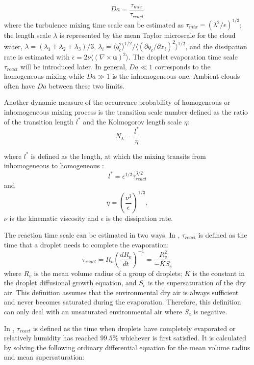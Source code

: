 \begin{equation}
Da=\frac{\tau_{mix}}{\tau_{react}}\label{eq:DaNumber}
\end{equation}
where the turbulence mixing time scale can be estimated as $\tau_{mix} = (\lambda^2/\epsilon)^{1/3}$; the 
length scale $\lambda$ is represented by the mean Taylor microscale for the cloud water, $\lambda = 
(\lambda_1+\lambda_2+\lambda_3)/3$, $\lambda_i = \langle q_c^2\rangle^{1/2}/\langle(\partial q_c/\partial 
x_i)^2\rangle^{1/2}$, and the dissipation rate is estimated with $\epsilon = 2\nu\langle(\nabla\times 
\mathbf{u})^2\rangle$. The droplet evaporation time scale $\tau_{react}$ will be introduced later.
In general, $Da\ll1$ corresponds to the homogeneous mixing while $Da\gg1$ is
the inhomogeneous one. Ambient clouds often have $Da$ between these two limits.

Another dynamic measure of the occurrence probability of homogeneous or inhomogeneous 
mixing process is the transition scale number \cite{Lu2011} defined as the ratio of 
the transition length $l^{*}$ and the Kolmogorov length scale $\eta$:
\begin{equation}
N_{L}=\frac{l^{*}}{\eta}\label{eq:NL}
\end{equation}
 
where $l^{*}$ is defined as the length, at which the mixing transits from inhomogeneous 
to homogeneous \cite{Lehmann2009}:
\[
l^{*}=\epsilon^{1/2}\tau_{react}^{3/2}
\]
and 
\[
\eta = (\frac{\nu^3}{\epsilon})^{1/3}, 
\]
$\nu$ is the kinematic viscosity and $\epsilon$ is the dissipation rate.

The reaction time scale can be estimated in two ways. 
In \cite{Andrejczuk2009, Burnet2007Observational}, $\tau_{react}$ is defined as the time that a droplet needs 
to complete the evaporation:
\begin{equation}
\tau_{react} = R_v(\frac{dR_v}{dt})^{-1} = \frac{R_v^2}{-KS_e}
\end{equation}
where $R_v$ is the mean volume radius of a group of droplets; $K$ is the constant in the 
droplet diffusional growth equation, and $S_e$ is the supersaturation of the dry air. 
This definition assumes that the environmental dry air is always 
sufficient and never becomes saturated during the evaporation. Therefore, this definition 
can only deal with an unsaturated environmental air where $S_e$ is negative.

In \cite{Lehmann2009, Lu2013}, $\tau_{react}$ is defined as the time when droplets have completely 
evaporated or relatively humidity has reached $99.5\%$ whichever is first satisfied. It is calculated 
by solving the following ordinary differential equation for the mean volume radius and mean supersaturation:

